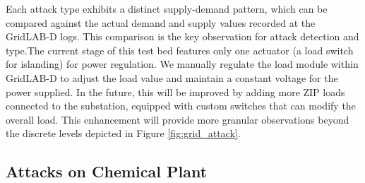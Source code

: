 Each attack type exhibits a distinct supply-demand pattern, which can be compared against the actual demand and supply values recorded at the GridLAB-D logs. This comparison is the key observation for attack detection and type.The current stage of this test bed features only one actuator (a load switch for islanding) for power regulation. We manually regulate the load module within GridLAB-D to adjust the load value and maintain a constant voltage for the power supplied. In the future, this will be improved by adding more ZIP loads connected to the substation, equipped with custom switches that can modify the overall load. This enhancement will provide more granular observations beyond the discrete levels depicted in Figure \ref{fig:grid_attack}.









\subsection{Attacks on Chemical Plant}
    
